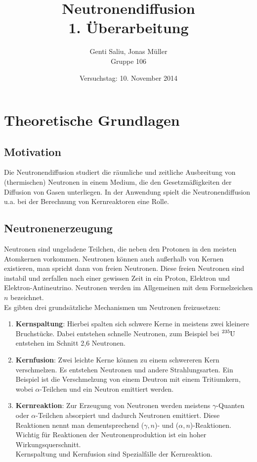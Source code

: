\documentclass[a4paper,titlepage]{scrartcl}
\title{Neutronendiffusion\\\normalsize 1. Überarbeitung}
\author{Genti Saliu, Jonas Müller\\Gruppe 106}
\date{Versuchstag: 10. November 2014}
\numberwithin{equation}{section}
\begin{document}
	\begin{titlepage}
		\maketitle
		\thispagestyle{empty}
	\end{titlepage}
	
\newpage
{}
\tableofcontents

\newpage
{}

\section{Theoretische Grundlagen}

\subsection{Motivation}
Die Neutronendiffusion studiert die räumliche und zeitliche Ausbreitung von (thermischen) Neutronen in einem Medium, die den Gesetzmäßigkeiten der Diffusion von Gasen unterliegen. In der Anwendung spielt die Neutronendiffusion u.a. bei der Berechnung von Kernreaktoren eine Rolle.

\subsection{Neutronenerzeugung}
Neutronen sind ungeladene Teilchen, die neben den Protonen in den meisten Atomkernen vorkommen. Neutronen können auch außerhalb von Kernen existieren, man spricht dann von freien Neutronen. Diese freien Neutronen sind instabil und zerfallen nach einer gewissen Zeit in ein Proton, Elektron und Elektron-Antineutrino. Neutronen werden im Allgemeinen mit dem Formelzeichen $n$ bezeichnet.\\
Es gibten drei grundsätzliche Mechanismen um Neutronen freizusetzen:

\begin{enumerate}
\item \textbf{Kernspaltung}: Hierbei spalten sich schwere Kerne in meistens zwei kleinere Bruchstücke. Dabei entstehen schnelle Neutronen, zum Beispiel bei $\ce{^{235}U}$ entstehen im Schnitt 2,6 Neutronen.
\item \textbf{Kernfusion}: Zwei leichte Kerne können zu einem schwereren Kern verschmelzen. Es entstehen Neutronen und andere Strahlungsarten. Ein Beispiel ist die Verschmelzung von einem Deutron mit einem Tritiumkern, wobei $\alpha$-Teilchen und ein Neutron emittiert werden.
\item \textbf{Kernreaktion}: Zur Erzeugung von Neutronen werden meistens $\gamma$-Quanten oder $\alpha$-Teilchen absorpiert und dadurch Neutronen emittiert. Diese Reaktionen nennt man dementsprechend ($\gamma, n$)- und ($\alpha, n$)-Reaktionen. Wichtig für Reaktionen der Neutronenproduktion ist ein hoher Wirkungsquerschnitt.\\
Kernspaltung und Kernfusion sind Spezialfälle der Kernreaktion.
\end{enumerate}
\end{document}
